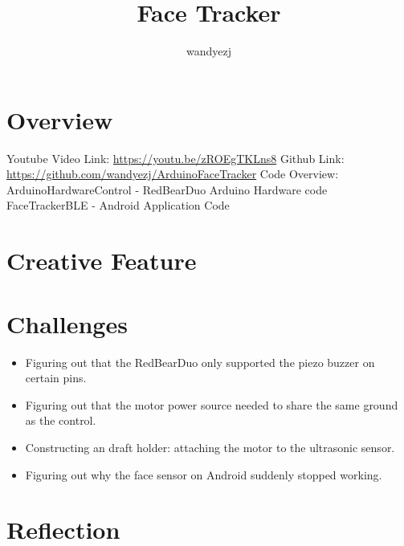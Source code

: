 \documentclass{article}
\title{Face Tracker}
\author{wandyezj}
\begin{document}
	\maketitle
	\tableofcontents
	
	
	
	\clearpage
	
	\section{Overview}
	
	Youtube Video Link: \href{https://youtu.be/zROEgTKLns8}{https://youtu.be/zROEgTKLns8}\newline
	Github Link: \href{https://github.com/wandyezj/ArduinoFaceTracker}{https://github.com/wandyezj/ArduinoFaceTracker}\newline
	\newline
	Code Overview:
	\newline
	ArduinoHardwareControl - RedBearDuo Arduino Hardware code
	\newline
	FaceTrackerBLE - Android Application Code
	\newline
	\newline
	
	
	
	\section{Creative Feature}
	\section{Challenges}
	
	\begin{itemize}
		\item Figuring out that the RedBearDuo only supported the piezo buzzer on certain pins.
		\item Figuring out that the motor power source needed to share the same ground as the control.
		\item Constructing an draft holder: attaching the motor to the ultrasonic sensor.
		\item Figuring out why the face sensor on Android suddenly stopped working.
	\end{itemize}
	
	
	\section{Reflection}
	
\end{document}
